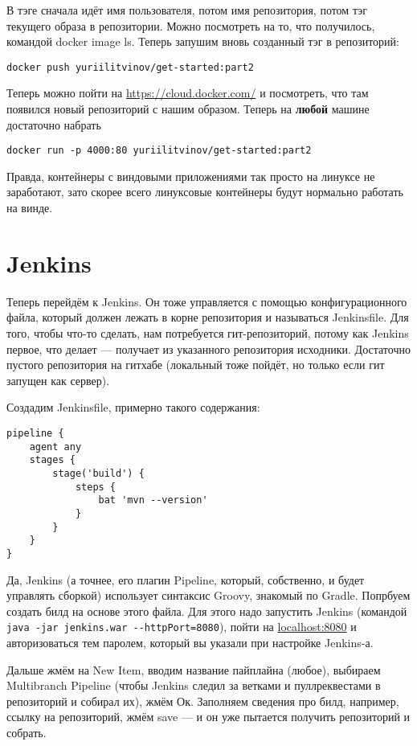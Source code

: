 \documentclass[a5paper]{article}
\begin{document}
В тэге сначала идёт имя пользователя, потом имя репозитория, потом тэг текущего образа в репозитории. Можно посмотреть на то, что получилось, командой docker image ls. Теперь 
запушим вновь созданный тэг в репозиторий:

\begin{verbatim}
docker push yuriilitvinov/get-started:part2
\end{verbatim}

Теперь можно пойти на \url{https://cloud.docker.com/} и посмотреть, что там появился новый репозиторий с нашим образом. Теперь на \textbf{любой} машине достаточно набрать
\begin{verbatim}
docker run -p 4000:80 yuriilitvinov/get-started:part2
\end{verbatim}

Правда, контейнеры с виндовыми приложениями так просто на линуксе не заработают, зато скорее всего линуксовые контейнеры будут нормально работать на винде.

\section{Jenkins}

Теперь перейдём к Jenkins. Он тоже управляется с помощью конфигурационного файла, который должен лежать в корне репозитория и называться Jenkinsfile. Для того, чтобы что-то сделать, нам потребуется
гит-репозиторий, потому как Jenkins первое, что делает --- получает из указанного репозитория исходники. Достаточно пустого репозитория на гитхабе (локальный тоже пойдёт, но только если гит запущен как сервер).

Создадим Jenkinsfile, примерно такого содержания:

\begin{verbatim}
pipeline {
    agent any
    stages {
        stage('build') {
            steps {
                bat 'mvn --version'
            }
        }
    }
}
\end{verbatim}

Да, Jenkins (а точнее, его плагин Pipeline, который, собственно, и будет управлять сборкой) использует синтаксис Groovy, знакомый по Gradle. Попрбуем создать билд на основе этого файла.
Для этого надо запустить Jenkins (командой \verb|java -jar jenkins.war --httpPort=8080|), пойти на \url{localhost:8080} и авторизоваться тем паролем, который вы указали при настройке Jenkins-а.

Дальше жмём на New Item, вводим название пайплайна (любое), выбираем Multibranch Pipeline (чтобы Jenkins следил за ветками и пуллреквестами в репозиторий и собирал их), жмём Ок. Заполняем сведения про билд, 
например, ссылку на репозиторий, жмём save --- и он уже пытается получить репозиторий и собрать. 
\end{document}
